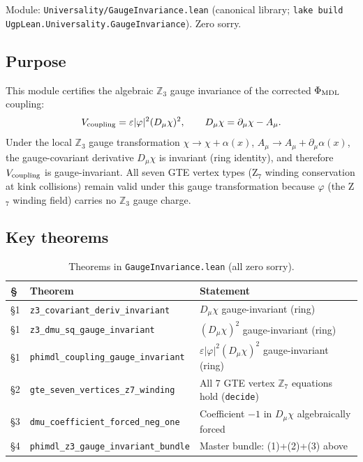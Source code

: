 \documentclass[11pt,a4paper]{article}
\theoremstyle{definition}
\begin{document}
Module: \texttt{Universality/GaugeInvariance.lean}
(canonical library; \texttt{lake build UgpLean.Universality.GaugeInvariance}).
Zero sorry.

\subsection*{Purpose}

This module certifies the algebraic $\mathbb{Z}_3$ gauge invariance of the
corrected $\Phi_{\rm MDL}$ coupling:
\[
  V_{\rm coupling} = \varepsilon|\varphi|^2(D_\mu\chi)^2,
  \qquad
  D_\mu\chi = \partial_\mu\chi - A_\mu.
\]
Under the local $\mathbb{Z}_3$ gauge transformation $\chi \to \chi + \alpha(x)$,
$A_\mu \to A_\mu + \partial_\mu\alpha(x)$, the gauge-covariant derivative $D_\mu\chi$
is invariant (ring identity), and therefore $V_{\rm coupling}$ is gauge-invariant.
All seven GTE vertex types (Z$_7$ winding conservation at kink collisions) remain
valid under this gauge transformation because $\varphi$ (the Z$_7$ winding field)
carries no $\mathbb{Z}_3$ gauge charge.

\subsection*{Key theorems}

\begin{table}[H]
\centering
\small
\begin{tabular}{@{}lll@{}}
\toprule
\S & Theorem & Statement \\
\midrule
§1 & \texttt{z3\_covariant\_deriv\_invariant}
  & $D_\mu\chi$ gauge-invariant (ring) \\
§1 & \texttt{z3\_dmu\_sq\_gauge\_invariant}
  & $(D_\mu\chi)^2$ gauge-invariant (ring) \\
§1 & \texttt{phimdl\_coupling\_gauge\_invariant}
  & $\varepsilon|\varphi|^2(D_\mu\chi)^2$ gauge-invariant (ring) \\
§2 & \texttt{gte\_seven\_vertices\_z7\_winding}
  & All 7 GTE vertex $\mathbb{Z}_7$ equations hold (\texttt{decide}) \\
§3 & \texttt{dmu\_coefficient\_forced\_neg\_one}
  & Coefficient $-1$ in $D_\mu\chi$ algebraically forced \\
§4 & \texttt{phimdl\_z3\_gauge\_invariant\_bundle}
  & Master bundle: (1)+(2)+(3) above \\
\bottomrule
\end{tabular}
\caption{Theorems in \texttt{GaugeInvariance.lean} (all zero sorry).}
\label{tab:gauge-invariance}
\end{table}
\end{document}
